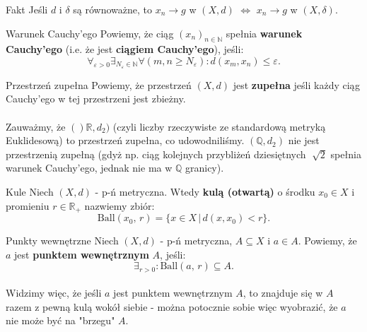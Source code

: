 \documentclass{article}
\newcommand{\R}{\mathbb{R}}
\newcommand{\N}{\mathbb{N}}
\newcommand{\Q}{\mathbb{Q}}
\newcommand{\eps}{\varepsilon}
\newcommand{\ciag}[1]{(#1_{n})_{n \in \N}}
\newcommand{\ball}[2]{\text{Ball}(#1, \, #2)}
\begin{document}
     \begin{obs}{Fakt}
        Jeśli $d$ i $\delta$ są równoważne, to $x_n \to g$ w $(X, d)$ $\iff$ $x_n \to g$ w $(X, \delta)$.
     \end{obs}

     \begin{defr}{Warunek Cauchy'ego}
        Powiemy, że ciąg $\ciag{x}$ spełnia \textbf{warunek Cauchy'ego} (i.e. że jest \textbf{ciągiem Cauchy'ego}), jeśli:
        \begin{equation}
            \forall_{\eps > 0} \exists_{N_\eps \in \N} \forall (m,n \geqslant N_\eps): d(x_m, x_n) \leqslant \eps.
        \end{equation}
     \end{defr}

     \begin{defr}{Przestrzeń zupełna}
        Powiemy, że przestrzeń $(X,d)$ jest \textbf{zupełna} jeśli każdy ciąg Cauchy'ego w tej przestrzeni jest zbieżny.
     \end{defr}

     \paragraph{} Zauważmy, że $()\R, d_2)$ (czyli liczby rzeczywiste ze standardową metryką Euklidesową) to przestrzeń zupełna, co udowodniliśmy. $(\Q, d_2)$ nie jest przestrzenią zupełną (gdyż np. ciąg kolejnych przybliżeń dziesiętnych $\sqrt[]{2}$ spełnia warunek Cauchy'ego, jednak nie ma w $\Q$ granicy).\

     \begin{defr}{Kule}
        Niech $(X, d)$ - p-ń metryczna. Wtedy \textbf{kulą (otwartą)} o środku $x_0 \in X$ i promieniu $r \in \R_+$ nazwiemy zbiór:
        \begin{equation}
            \ball{x_0}{r} = \{ x\in X \, | \, d(x, x_0) < r\}.
        \end{equation}
     \end{defr}

     \begin{defr}{Punkty wewnętrzne}
        Niech $(X, d)$ - p-ń metryczna, $A \subseteq X$ i $a \in A$. Powiemy, że $a$ jest \textbf{punktem wewnętrznym} $A$, jeśli:
        \begin{equation}
            \exists_{r>0}: \ball{a}{r} \subseteq A.
        \end{equation}
     \end{defr}

     \paragraph{} Widzimy więc, że jeśli $a$ jest punktem wewnętrznym $A$, to znajduje się w $A$ razem z pewną kulą wokół siebie - można potocznie sobie więc wyobrazić, że $a$ nie może być na "brzegu" $A$.
\end{document}
